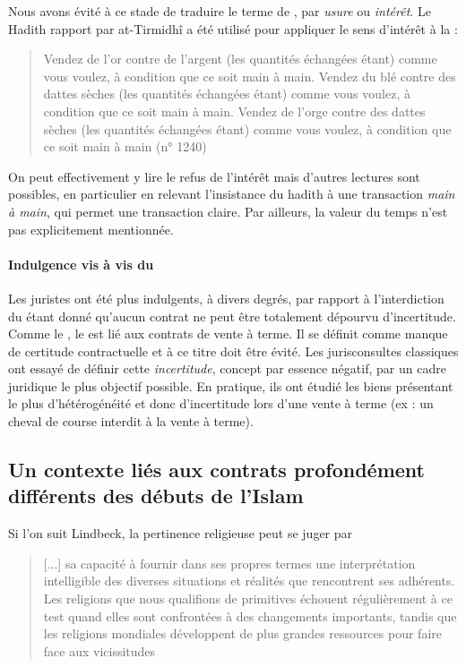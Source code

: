   Nous avons évité à ce stade de traduire le terme de \textit{\riba}, par \textit{usure} ou \textit{intérêt}. Le Hadith rapport par at-Tirmidhî a été utilisé pour appliquer le sens d'intérêt à la \textit{\riba}  : 
 \begin{quote}
     Vendez de l'or contre de l'argent (les quantités échangées étant) comme vous voulez, à condition que ce soit main à main. Vendez du blé contre des dattes sèches (les quantités échangées étant) comme vous voulez, à condition que ce soit main à main. Vendez de l'orge contre des dattes sèches (les quantités échangées étant) comme vous voulez, à condition que ce soit main à main (n° 1240)
 \end{quote}  
 On peut effectivement y lire le refus de l'intérêt mais d'autres lectures sont possibles, en particulier en relevant l'insistance du hadith à une transaction \textit{main à main}, qui permet une transaction claire. Par ailleurs, la valeur du temps n'est pas explicitement mentionnée.
 
\paragraph{Indulgence vis à vis du \gharar}

Les juristes ont été plus indulgents, à divers degrés, par rapport à l’interdiction du \gharar étant donné qu’aucun contrat ne peut être totalement dépourvu d’incertitude. 
Comme le \riba, le \gharar est lié aux contrats de vente à terme. Il se définit comme manque de certitude contractuelle et à ce titre doit être évité. Les jurisconsultes classiques  ont essayé de définir cette \textit{incertitude}, concept par essence négatif, par un cadre juridique le plus objectif possible. En pratique, ils ont étudié les biens présentant le plus d'hétérogénéité et donc d'incertitude lors d'une vente à terme (ex : un cheval de course interdit à la vente à terme). 
 
\subsection{Un contexte liés aux contrats profondément différents des débuts de l'Islam}
Si l'on suit Lindbeck, la pertinence religieuse peut se juger par  
\begin{quote}
     [...] sa capacité à fournir dans ses propres termes une interprétation intelligible des diverses situations et réalités que rencontrent ses adhérents. Les religions que nous qualifions de primitives échouent régulièrement à ce test quand elles sont confrontées à des changements importants, tandis que les religions mondiales développent de plus grandes ressources pour faire face aux vicissitudes  
\end{quote}

